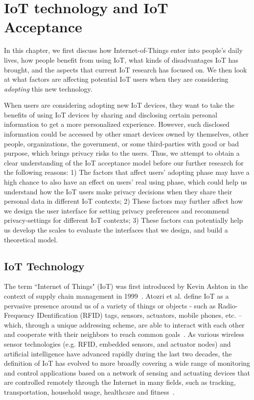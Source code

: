 \chapter{IoT technology and IoT Acceptance}\label{chapter:Relatedwork1}
In this chapter, we first discuss how Internet-of-Things enter into people's daily lives, how people benefit from using IoT, what kinds of disadvantages IoT has brought, and the aspects that current IoT research has focused on. We then look at what factors are affecting potential IoT users when they are considering \textit{adopting} this new technology.

When users are considering adopting new IoT devices, they want to take the benefits of using IoT devices by sharing and disclosing certain personal information to get a more personalized experience. However, such disclosed information could be accessed by other smart devices owned by themselves, other people, organizations, the government, or some third-parties with good or bad purpose, which brings privacy risks to the users. Thus, we attempt to obtain a clear understanding of the IoT acceptance model before our further research for the following reasons: 1) The factors that affect users' adopting phase may have a high chance to also have an effect on users' real using phase, which could help us understand how the IoT users make privacy decisions when they share their personal data in different IoT contexts; 2) These factors may further affect how we design the user interface for setting privacy preferences and recommend privacy-settings for different IoT contexts; 3) These factors can potentially help us develop the scales to evaluate the interfaces that we design, and build a theoretical model.

\section{IoT Technology}
The term ``Internet of Things" (IoT) was first introduced by Kevin Ashton in the context of supply chain management in 1999~\cite{ashton2009internet}. Atozri et al. define IoT as a pervasive presence around us of a variety of things or objects - such as Radio-Frequency IDentification (RFID) tags, sensors, actuators, mobile phones, etc. -- which, through a unique addressing scheme, are able to interact with each other and cooperate with their neighbors to reach common goals~\cite{atzori2010internet}. As various wireless sensor technologies (e.g. RFID, embedded sensors, and actuator nodes) and artificial intelligence have advanced rapidly during the last two decades, the definition of IoT has evolved to more broadly covering a wide range of monitoring and control applications based on a network of sensing and actuating devices that are controlled remotely through the Internet in many fields, such as tracking, transportation, household usage, healthcare and fitness~\cite{li2011smart, solima2016object, kelly2013towards, jia2012rfid, hassanalieragh2015health}.

